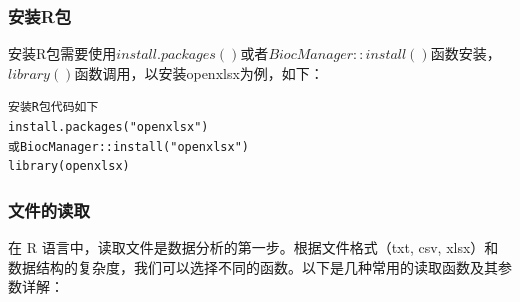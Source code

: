\subsubsection{安装R包}
安装R包需要使用$install.packages()$或者$BiocManager::install()$函数安装，$library()$函数调用，以安装openxlsx为例，如下：
\begin{lstlisting}
安装R包代码如下
install.packages("openxlsx")
或BiocManager::install("openxlsx")
library(openxlsx)    
\end{lstlisting}
\subsubsection{文件的读取}

在 R 语言中，读取文件是数据分析的第一步。根据文件格式（txt, csv, xlsx）和数据结构的复杂度，我们可以选择不同的函数。以下是几种常用的读取函数及其参数详解：

